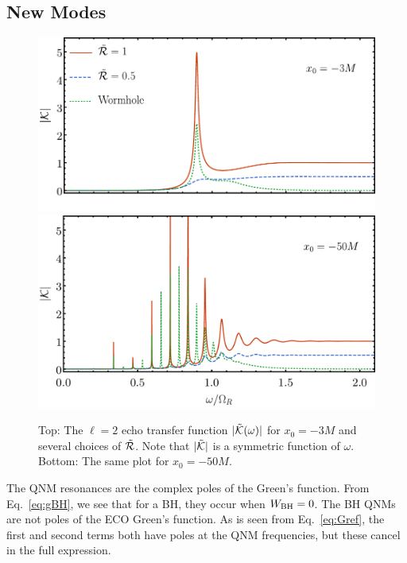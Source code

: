 \begin{refsection}
\subsection{New Modes}
\label{sec:ECOModes}

\begin{figure}[t]
\includegraphics[width = 1 \columnwidth]{chapter_echo/etc/singlemodetransferplot}\\
\vspace{-14.5 pt}
\includegraphics[width = 1 \columnwidth]{chapter_echo/etc/multimodetransferplot}
\caption{
Top: The $\ell=2$ echo transfer function $|\tilde{\mathcal K}(\omega)|$ for $x_0=-3M$ and several choices of $\tilde{\mathcal R}$. Note that $|\tilde{\mathcal K}|$ is a symmetric function of $\omega$. Bottom: The same plot for $x_0=-50M$.
}
\label{fig:NewModes}
\end{figure}

The QNM resonances are the complex poles of the Green's function.
From Eq.~\eqref{eq:gBH}, we see that for a BH, they occur when $W_{\rm BH} = 0$. 
The BH QNMs are not poles of the ECO Green's function. 
As is seen from Eq.~\eqref{eq:Gref}, the first and second terms both have poles at the QNM frequencies, but these cancel in the full expression.


\end{refsection}
